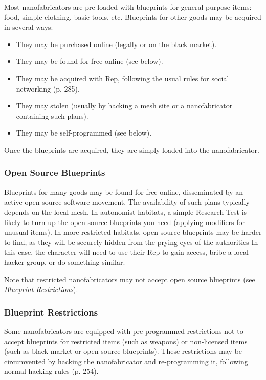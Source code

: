 Most nanofabricators are pre-loaded with blueprints for general purpose items: food, simple clothing, basic tools, etc. Blueprints for other goods may be acquired in several ways: 

\begin{itemize} \item They may be purchased online (legally or on the black market). \item They may be found for free online (see below). \item They may be acquired with Rep, following the usual rules for social networking (p. 285). \item They may stolen (usually by hacking a mesh site or a nanofabricator containing such plans). \item They may be self-programmed (see below). \end{itemize} 

\noindent Once the blueprints are acquired, they are simply loaded into the nanofabricator. 

\subsubsection{Open Source Blueprints} 

Blueprints for many goods may be found for free online, disseminated by an active open source software movement. The availability of such plans typically depends on the local mesh. In autonomist habitats, a simple Research Test is likely to turn up the open source blueprints you need (applying modifiers for unusual items). In more restricted habitats, open source blueprints may be harder to find, as they will be securely hidden from the prying eyes of the authorities In this case, the character will need to use their Rep to gain access, bribe a local hacker group, or do something similar. 

Note that restricted nanofabricators may not accept open source blueprints (see \textit{Blueprint Restrictions}). 

\subsubsection{Blueprint Restrictions} 

Some nanofabricators are equipped with pre-programmed restrictions not to accept blueprints for restricted items (such as weapons) or non-licensed items (such as black market or open source blueprints). These restrictions may be circumvented by hacking the nanofabricator and re-programming it, following normal hacking rules (p. 254). 

